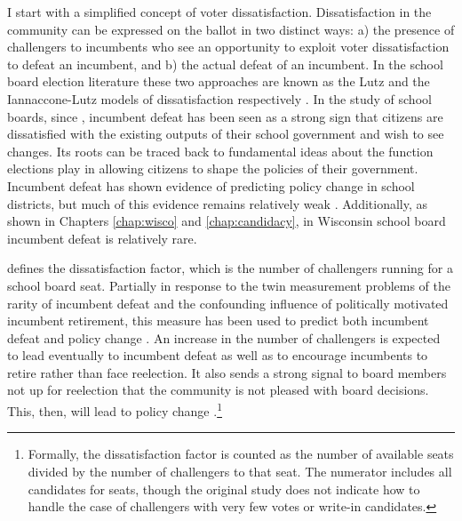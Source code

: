 I start with a simplified concept of voter dissatisfaction. Dissatisfaction in 
the community can be expressed on the ballot in two distinct ways: a) the presence 
of challengers to incumbents who see an opportunity to exploit voter dissatisfaction 
to defeat an incumbent, and b) the actual defeat of an incumbent. In the school 
board election literature these two approaches are known as the Lutz and the 
Iannaccone-Lutz models of dissatisfaction respectively 
\citep{RefWorks:337,RefWorks:297}. In the study of school boards, since 
\citet{RefWorks:297}, incumbent defeat has 
been seen as a strong sign that citizens are dissatisfied with the existing 
outputs of their school government and wish to see changes. Its roots can be 
traced back to fundamental ideas about the function elections play in allowing 
citizens to shape the policies of their government. Incumbent defeat has shown 
evidence of predicting policy change in school districts, but much of this evidence 
remains relatively weak \citep{RefWorks:312}. Additionally, as shown in 
Chapters \ref{chap:wisco} and \ref{chap:candidacy}, in Wisconsin school board 
incumbent defeat is relatively rare. 

\citet{RefWorks:337} defines the dissatisfaction 
factor, which is the number of challengers running for a school board seat. Partially 
in response to the twin measurement problems of the rarity of incumbent defeat 
and the confounding influence of politically motivated incumbent retirement, 
this measure has been used to predict both incumbent defeat and policy change 
\citep{RefWorks:337,RefWorks:247}. 
An increase in the number of challengers is expected to 
lead eventually to incumbent defeat as well as to encourage incumbents to retire 
rather than face reelection. It also sends a strong signal to board members not 
up for reelection that the community is not pleased with board decisions. This, 
then, will lead to policy change \citep{RefWorks:247}.\footnote{
Formally, the dissatisfaction factor is counted as the number of available seats 
divided by the number of challengers to that seat. The numerator includes all 
candidates for seats, though the original study does not indicate how to handle 
the case of challengers with very few votes or write-in candidates.}

